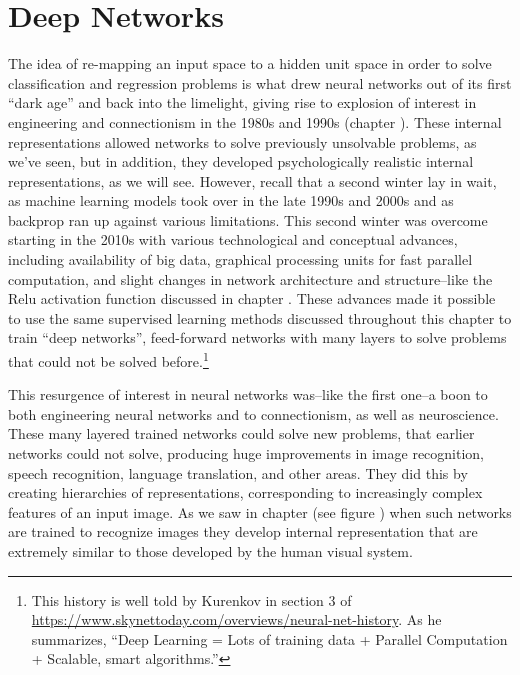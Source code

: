 \section{Deep Networks}


The idea of re-mapping an input space to a hidden unit space in order to solve classification and regression problems is what drew neural networks out of its first ``dark age'' and back into the limelight, giving rise to explosion of interest in engineering and connectionism in the 1980s and 1990s (chapter ). These internal representations allowed networks to  solve previously unsolvable problems, as we've seen, but in addition, they developed psychologically realistic internal representations, as we will see. However, recall that a second  winter lay in wait, as machine learning models took over in the late 1990s and 2000s and as backprop  ran up against various limitations. This second winter was overcome starting in the 2010s with various technological and conceptual advances, including availability of big data, graphical  processing units for  fast parallel computation, and slight changes in network architecture and structure--like the Relu activation function discussed in chapter . These advances made it possible to use the same supervised learning methods discussed throughout this chapter to train ``deep networks'', feed-forward networks with many layers to solve problems that could not be solved before.\footnote{This history is well told by Kurenkov in section 3 of \url{https://www.skynettoday.com/overviews/neural-net-history}. As he summarizes, ``Deep Learning = Lots of training data + Parallel Computation + Scalable, smart algorithms.''} 

This resurgence of interest  in neural networks was--like the first one--a boon to both engineering neural networks and to connectionism, as well as neuroscience. These many layered trained networks could solve new problems, that earlier networks could not solve, producing huge improvements in image recognition, speech recognition, language translation, and other areas. They did this by creating hierarchies of representations, corresponding  to increasingly complex features of an input image. As we saw in chapter  (see figure ) when such networks are trained to recognize images they develop internal representation that are extremely similar to those developed by the human visual  system.

